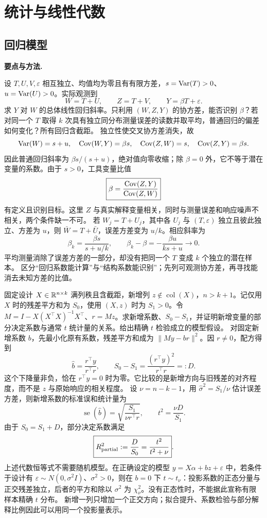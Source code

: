 \chapter{统计与线性代数}

\section{回归模型}
\noindent\textbf{要点与方法.}\enspace



设 $T,U,V,\varepsilon$ 相互独立、均值均为零且有有限方差，$s=\operatorname{Var}(T)>0$、$u=\operatorname{Var}(U)>0$。实际观测到
\[
 W=T+U,\qquad Z=T+V,\qquad Y=\beta T+\varepsilon.
\]
求 $Y$ 对 $W$ 的总体线性回归斜率。只利用 $(W,Z,Y)$ 的协方差，能否识别 $\beta$？若对同一个 $T$ 取得 $k$ 次具有独立同分布测量误差的读数并取平均，普通回归的偏差如何变化？所有回归含截距。
\solution 独立性使交叉协方差消失，故
\[
 \operatorname{Var}(W)=s+u,\quad \operatorname{Cov}(W,Y)=\beta s,
 \quad \operatorname{Cov}(Z,W)=s,\quad \operatorname{Cov}(Z,Y)=\beta s.
\]
因此普通回归斜率为 $\beta s/(s+u)$，绝对值向零收缩；除 $\beta=0$ 外，它不等于潜在变量的系数。由于 $s>0$，工具变量比值
\[
 \boxed{\beta=\frac{\operatorname{Cov}(Z,Y)}{\operatorname{Cov}(Z,W)}}
\]
有定义且识别目标。这里 $Z$ 与真实解释变量相关，同时与测量误差和响应噪声不相关，两个条件缺一不可。
若 $W_j=T+U_j$，其中各 $U_j$ 与 $(T,\varepsilon)$ 独立且彼此独立、方差为 $u$，则 $\bar W=T+\bar U$，误差方差变为 $u/k$。相应斜率为
\[
 \beta_k=\frac{\beta s}{s+u/k},\qquad
 \beta_k-\beta=-\frac{\beta u}{ks+u}\longrightarrow0.
\]
平均测量消除了误差方差的一部分，却没有把同一个 $T$ 变成 $k$ 个独立的潜在样本。
\insight 区分“回归系数能计算”与“结构系数能识别”；先列可观测协方差，再寻找能消去未知方差的比值。

固定设计 $X\in\mathbb{R}^{n\times k}$ 满列秩且含截距，新增列 $z\notin\operatorname{col}(X)$，$n>k+1$。记仅用 $X$ 时的残差平方和为 $S_0$，使用 $(X,z)$ 时为 $S_1>0$。令 $M=I-X(X^\top X)^{-1}X^\top$、$r=Mz$。求新增系数、$S_0-S_1$，并证明新增变量的部分决定系数与通常 $t$ 统计量的关系。给出精确 $t$ 检验成立的模型假设。
\solution 对固定新增系数 $b$，先最小化原有系数，残差平方和成为 $\|M y-br\|^2$。因 $r\ne0$，配方得到
\[
 \widehat b=\frac{r^\top y}{r^\top r},\qquad
 S_0-S_1=\frac{(r^\top y)^2}{r^\top r}=:D.
\]
这个下降量非负，恰在 $r^\top y=0$ 时为零。它比较的是新增方向与旧残差的对齐程度，而不是 $z$ 与原始响应的相关程度。
设 $\nu=n-k-1$，用 $\widehat\sigma^2=S_1/\nu$ 估计误差方差，则新增系数的标准误和统计量为
\[
 \operatorname{se}(\widehat b)=\sqrt{\frac{S_1}{\nu r^\top r}},
 \qquad t^2=\frac{\nu D}{S_1}.
\]
由于 $S_0=S_1+D$，部分决定系数满足
\[
 \boxed{R^2_{\rm partial}:=\frac{D}{S_0}
       =\frac{t^2}{t^2+\nu}}.
\]
上述代数恒等式不需要随机模型。在正确设定的模型 $y=X\alpha+bz+\varepsilon$ 中，若条件于设计有 $\varepsilon\sim N(0,\sigma^2I)$、$\sigma^2>0$，则在 $b=0$ 下 $t\sim t_\nu$：投影系数的正态分量与正交残差独立，后者的平方和除以 $\sigma^2$ 为 $\chi^2_\nu$。没有正态性时，不能据此宣称有限样本精确 $t$ 分布。
\insight 新增一列只增加一个正交方向；拟合提升、系数检验与部分解释比例因此可以用同一个投影量表示。

